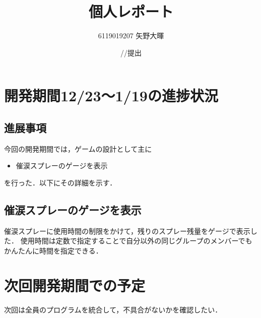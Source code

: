 \documentclass{jarticle}
\title{個人レポート}
\author{6119019207 矢野大暉}
\date{\number\year/\number\month/\number\day 提出}
\newcommand{\xb}{催涙スプレーのゲージを表示}
\newcommand{\pitem}[1]{
\item #1
}
\begin{document}
\maketitle

\section{開発期間12/23～1/19の進捗状況} 

\subsection{進展事項}
今回の開発期間では，ゲームの設計として主に
\begin{itemize}
\pitem{\xb}
\end{itemize}
を行った．以下にその詳細を示す．

\subsection{\xb}
催涙スプレーに使用時間の制限をかけて，残りのスプレー残量をゲージで表示した．
使用時間は定数で指定することで自分以外の同じグループのメンバーでもかんたんに時間を指定できる．

\section{次回開発期間での予定}
次回は全員のプログラムを統合して，不具合がないかを確認したい．
\end{document}

